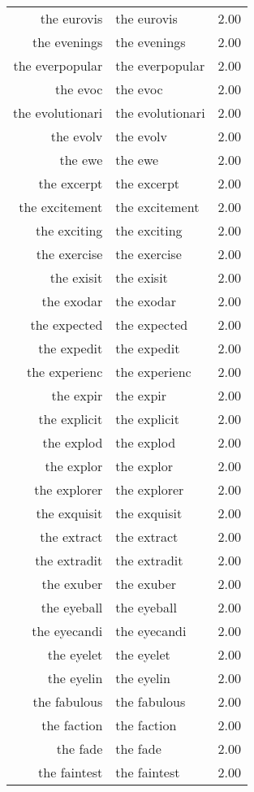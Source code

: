 \begin{table}[ht]
\begin{tabular}{rlr}
  the eurovis & the eurovis & 2.00 \\ 
  the evenings & the evenings & 2.00 \\ 
  the everpopular & the everpopular & 2.00 \\ 
  the evoc & the evoc & 2.00 \\ 
  the evolutionari & the evolutionari & 2.00 \\ 
  the evolv & the evolv & 2.00 \\ 
  the ewe & the ewe & 2.00 \\ 
  the excerpt & the excerpt & 2.00 \\ 
  the excitement & the excitement & 2.00 \\ 
  the exciting & the exciting & 2.00 \\ 
  the exercise & the exercise & 2.00 \\ 
  the exisit & the exisit & 2.00 \\ 
  the exodar & the exodar & 2.00 \\ 
  the expected & the expected & 2.00 \\ 
  the expedit & the expedit & 2.00 \\ 
  the experienc & the experienc & 2.00 \\ 
  the expir & the expir & 2.00 \\ 
  the explicit & the explicit & 2.00 \\ 
  the explod & the explod & 2.00 \\ 
  the explor & the explor & 2.00 \\ 
  the explorer & the explorer & 2.00 \\ 
  the exquisit & the exquisit & 2.00 \\ 
  the extract & the extract & 2.00 \\ 
  the extradit & the extradit & 2.00 \\ 
  the exuber & the exuber & 2.00 \\ 
  the eyeball & the eyeball & 2.00 \\ 
  the eyecandi & the eyecandi & 2.00 \\ 
  the eyelet & the eyelet & 2.00 \\ 
  the eyelin & the eyelin & 2.00 \\ 
  the fabulous & the fabulous & 2.00 \\ 
  the faction & the faction & 2.00 \\ 
  the fade & the fade & 2.00 \\ 
  the faintest & the faintest & 2.00 \\ 

\end{tabular}
\end{table}
